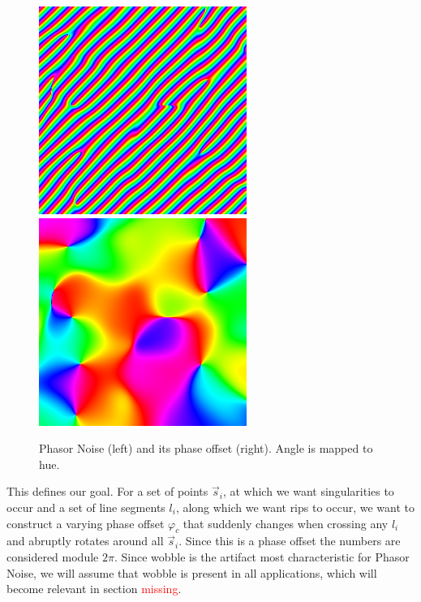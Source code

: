 \documentclass{utue} %
\begin{document}
\begin{figure}[h]
  \centering
  \includegraphics[width=0.45\linewidth]{images/phasorNoise}
  \includegraphics[width=0.45\linewidth]{images/phasorPhase}
  \caption{Phasor Noise (left) and its phase offset (right). Angle is mapped to hue.}\label{fig:phasorNoisePhase}
\end{figure}

This defines our goal. For a set of points $\vec{s}_i$, at which we want singularities to occur and a set of line segments $l_i$, along which we want rips to occur, we want to construct a varying phase offset $\varphi_c$ that suddenly changes when crossing any $l_i$ and abruptly rotates around all $\vec{s}_i$. Since this is a phase offset the numbers are considered module $2\pi$. Since wobble is the artifact most characteristic for Phasor Noise, we will assume that wobble is present in all applications, which will become relevant in section \textcolor{red}{missing}.
\end{document}
